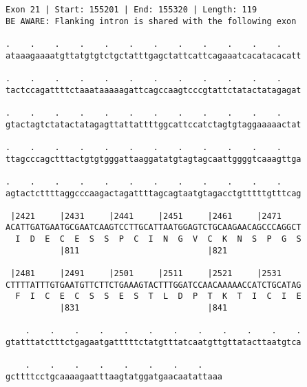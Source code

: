 \documentclass{article}
\begin{document}
\begin{Verbatim}
Exon 21 | Start: 155201 | End: 155320 | Length: 119
BE AWARE: Flanking intron is shared with the following exon
 
.    .    .    .    .    .    .    .    .    .    .    .    
ataaagaaaatgttatgtgtctgctatttgagctattcattcagaaatcacatacacatt
  
.    .    .    .    .    .    .    .    .    .    .    .    
tactccagattttctaaataaaaagattcagccaagtcccgtattctatactatagagat
  
.    .    .    .    .    .    .    .    .    .    .    .    
gtactagtctatactatagagttattattttggcattccatctagtgtaggaaaaactat
  
.    .    .    .    .    .    .    .    .    .    .    .    
ttagcccagctttactgtgtgggattaaggatatgtagtagcaattggggtcaaagttga
  
.    .    .    .    .    .    .    .    .    .    .    .    
agtactcttttaggcccaagactagattttagcagtaatgtagacctgtttttgtttcag
  
 |2421     |2431     |2441     |2451     |2461     |2471    
ACATTGATGAATGCGAATCAAGTCCTTGCATTAATGGAGTCTGCAAGAACAGCCCAGGCT
  I  D  E  C  E  S  S  P  C  I  N  G  V  C  K  N  S  P  G  S
           |811                          |821               
  
 |2481     |2491     |2501     |2511     |2521     |2531    
CTTTTATTTGTGAATGTTCTTCTGAAAGTACTTTGGATCCAACAAAAACCATCTGCATAG
  F  I  C  E  C  S  S  E  S  T  L  D  P  T  K  T  I  C  I  E
           |831                          |841               
  
    .    .    .    .    .    .    .    .    .    .    .    .
gtatttatctttctgagaatgatttttctatgtttatcaatgttgttatacttaatgtca
  
    .    .    .    .    .    .    .    .    
gcttttcctgcaaaagaatttaagtatggatgaacaatattaaa
\end{Verbatim}
\newpage
\end{document}
